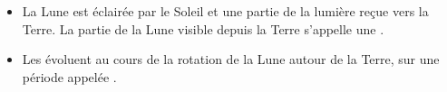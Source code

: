 \begin{mybilan}
	\begin{itemize}
		\item La Lune est éclairée par le Soleil et  une partie de la lumière reçue vers la Terre. La partie de la Lune visible depuis la Terre s'appelle une .
		\item Les  évoluent au cours de la rotation de la Lune autour de la Terre, sur une période appelée .

	\end{itemize}
\end{mybilan}
